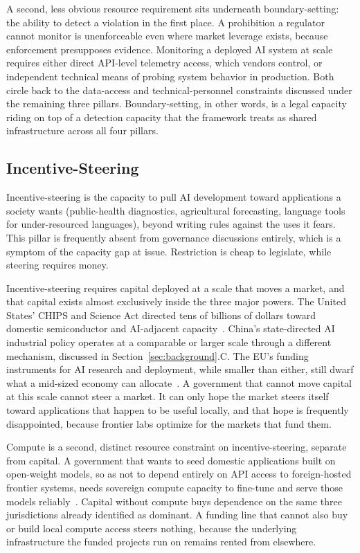 \documentclass{ieeeaccess}
\begin{document}
A second, less obvious resource requirement sits underneath boundary-setting: the ability to detect a violation in the first place. A prohibition a regulator cannot monitor is unenforceable even where market leverage exists, because enforcement presupposes evidence. Monitoring a deployed AI system at scale requires either direct API-level telemetry access, which vendors control, or independent technical means of probing system behavior in production. Both circle back to the data-access and technical-personnel constraints discussed under the remaining three pillars. Boundary-setting, in other words, is a legal capacity riding on top of a detection capacity that the framework treats as shared infrastructure across all four pillars.

\subsection{Incentive-Steering}

Incentive-steering is the capacity to pull AI development toward applications a society wants (public-health diagnostics, agricultural forecasting, language tools for under-resourced languages), beyond writing rules against the uses it fears. This pillar is frequently absent from governance discussions entirely, which is a symptom of the capacity gap at issue. Restriction is cheap to legislate, while steering requires money.

Incentive-steering requires capital deployed at a scale that moves a market, and that capital exists almost exclusively inside the three major powers. The United States' CHIPS and Science Act directed tens of billions of dollars toward domestic semiconductor and AI-adjacent capacity~\cite{chipsact2022}.
China's state-directed AI industrial policy operates at a comparable or larger scale through a different mechanism, discussed in Section~\ref{sec:background}.C. The EU's funding instruments for AI research and deployment, while smaller than either, still dwarf what a mid-sized economy can allocate~\cite{eccommission2024aiinnovation}.
A government that cannot move capital at this scale cannot steer a market. It can only hope the market steers itself toward applications that happen to be useful locally, and that hope is frequently disappointed, because frontier labs optimize for the markets that fund them.

Compute is a second, distinct resource constraint on incentive-steering, separate from capital. A government that wants to seed domestic applications built on open-weight models, so as not to depend entirely on API access to foreign-hosted frontier systems, needs sovereign compute capacity to fine-tune and serve those models reliably~\cite{huang2026fivelayers}.
Capital without compute buys dependence on the same three jurisdictions already identified as dominant. A funding line that cannot also buy or build local compute access steers nothing, because the underlying infrastructure the funded projects run on remains rented from elsewhere.
\end{document}
